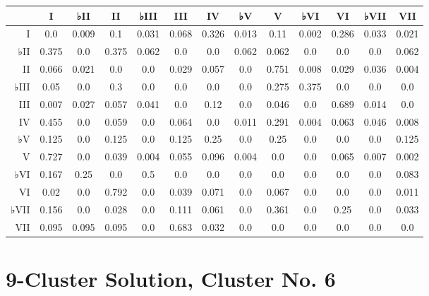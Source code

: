 \begin{table}[htbp]
\begin{minipage}{\linewidth}
\setlength{\tymax}{0.5\linewidth}
\centering
\small
\begin{tabulary}{\textwidth}{@{}RCCCCCCCCCCCC@{}} \toprule
&I&♭II&II&♭III&III&IV&♭V&V&♭VI&VI&♭VII&VII\\
\midrule
I&0.0&0.009&0.1&0.031&0.068&0.326&0.013&0.11&0.002&0.286&0.033&0.021\\
♭II&0.375&0.0&0.375&0.062&0.0&0.0&0.062&0.062&0.0&0.0&0.0&0.062\\
II&0.066&0.021&0.0&0.0&0.029&0.057&0.0&0.751&0.008&0.029&0.036&0.004\\
♭III&0.05&0.0&0.3&0.0&0.0&0.0&0.0&0.275&0.375&0.0&0.0&0.0\\
III&0.007&0.027&0.057&0.041&0.0&0.12&0.0&0.046&0.0&0.689&0.014&0.0\\
IV&0.455&0.0&0.059&0.0&0.064&0.0&0.011&0.291&0.004&0.063&0.046&0.008\\
♭V&0.125&0.0&0.125&0.0&0.125&0.25&0.0&0.25&0.0&0.0&0.0&0.125\\
V&0.727&0.0&0.039&0.004&0.055&0.096&0.004&0.0&0.0&0.065&0.007&0.002\\
♭VI&0.167&0.25&0.0&0.5&0.0&0.0&0.0&0.0&0.0&0.0&0.0&0.083\\
VI&0.02&0.0&0.792&0.0&0.039&0.071&0.0&0.067&0.0&0.0&0.0&0.011\\
♭VII&0.156&0.0&0.028&0.0&0.111&0.061&0.0&0.361&0.0&0.25&0.0&0.033\\
VII&0.095&0.095&0.095&0.0&0.683&0.032&0.0&0.0&0.0&0.0&0.0&0.0\\

\bottomrule

\end{tabulary}
\end{minipage}
\end{table}

\section{9-Cluster Solution, Cluster No. 6}
\label{9-clustersolutionclusterno.6}

